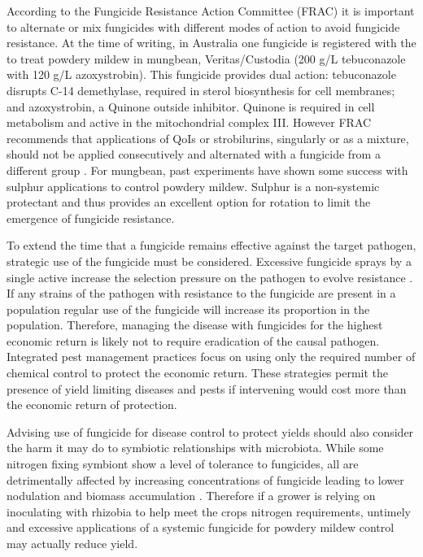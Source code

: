 \documentclass[agronomy,article,submit,moreauthors,pdftex]{mdpi}
\begin{document}
According to the Fungicide Resistance Action Committee (FRAC) it is important to alternate or mix fungicides with different modes of action to avoid fungicide resistance.
At the time of writing, in Australia one fungicide is registered with the to treat powdery mildew in mungbean, Veritas/Custodia (200 g/L tebuconazole with 120 g/L azoxystrobin).
This fungicide provides dual action: tebuconazole disrupts C-14 demethylase, required in sterol biosynthesis for cell membranes; and azoxystrobin, a Quinone outside inhibitor.
Quinone is required in cell metabolism and active in the mitochondrial complex III.
However FRAC recommends that applications of QoIs or strobilurins, singularly or as a mixture, should not be applied consecutively and alternated with a fungicide from a different group \citep{Brent2007}.
For mungbean, past experiments have shown some success with sulphur applications to control powdery mildew.
Sulphur is a non-systemic protectant and thus provides an excellent option for rotation to limit the emergence of fungicide resistance.

To extend the time that a fungicide remains effective against the target pathogen, strategic use of the fungicide must be considered.
Excessive fungicide sprays by a single active increase the selection pressure on the pathogen to evolve resistance \citep{Brent2007}.
If any strains of the pathogen with resistance to the fungicide are present in a population regular use of the fungicide will increase its proportion in the population.
Therefore, managing the disease with fungicides for the highest economic return is likely not to require eradication of the causal pathogen.
Integrated pest management practices focus on using only the required number of chemical control to protect the economic return.
These strategies permit the presence of yield limiting diseases and pests if intervening would cost more than the economic return of protection.

Advising use of fungicide for disease control to protect yields should also consider the harm it may do to symbiotic relationships with microbiota.
While some nitrogen fixing symbiont show a level of tolerance to fungicides, all are detrimentally affected by increasing concentrations of fungicide leading to lower nodulation and biomass accumulation \citep[\citet{Shahid2019}]{Ahemad2011}.
Therefore if a grower is relying on inoculating with rhizobia to help meet the crops nitrogen requirements, untimely and excessive applications of a systemic fungicide for powdery mildew control may actually reduce yield.
\end{document}
